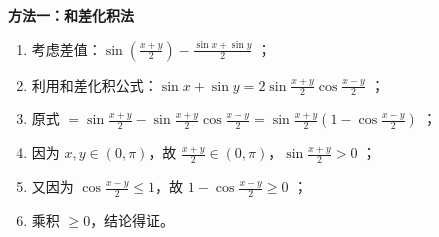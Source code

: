 \begin{proofbox}
\textbf{方法一：和差化积法}
\begin{enumerate}
    \item 考虑差值：$\sin\left(\frac{x+y}{2}\right) - \frac{\sin x + \sin y}{2}$ ；
    \item 利用和差化积公式：$\sin x + \sin y = 2\sin\frac{x+y}{2}\cos\frac{x-y}{2}$ ；
    \item 原式 $= \sin\frac{x+y}{2} - \sin\frac{x+y}{2}\cos\frac{x-y}{2} = \sin\frac{x+y}{2} \left(1 - \cos\frac{x-y}{2}\right)$ ；
    \item 因为 $x, y \in (0, \pi)$，故 $\frac{x+y}{2} \in (0, \pi)$，$\sin\frac{x+y}{2} > 0$ ；
    \item 又因为 $\cos\frac{x-y}{2} \leqslant 1$，故 $1 - \cos\frac{x-y}{2} \geqslant 0$ ；
    \item 乘积 $\geqslant 0$，结论得证。
\end{enumerate}
\end{proofbox}